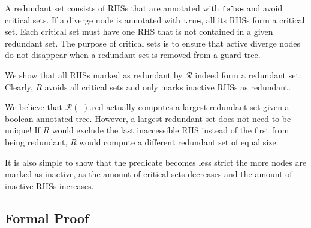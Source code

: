 A redundant set consists of RHSs that are annotated with $\mathtt{false}$ and avoid critical sets.
If a diverge node is annotated with $\mathtt{true}$, all its RHSs form a critical set.
Each critical set must have one RHS that is not contained in a given redundant set.
The purpose of critical sets is to ensure that active diverge nodes do not disappear when a redundant set is removed from a guard tree.

We show that all RHSs marked as redundant by $\mathcal{R}$ indeed form a redundant set: Clearly, $R$ avoids all critical sets and only marks inactive RHSs as redundant.

We believe that $\mathcal{R}(\_).\mathrm{red}$ actually computes a largest redundant set given a boolean annotated tree.
However, a largest redundant set does not need to be unique!
If $R$ would exclude the last inaccessible RHS instead of the first from being redundant, $R$ would compute a different redundant set of equal size.

It is also simple to show that the predicate becomes less strict the more nodes are marked as inactive, as the amount of critical sets decreases and the amount of inactive RHSs increases.

\subsection{Formal Proof}

